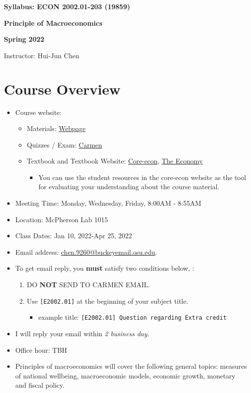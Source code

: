 \documentclass[12pt]{article}
\begin{document}
\centerline{\huge\bf Syllabus: ECON 2002.01-203 (19859)}
\medskip
\centerline{\LARGE \bf Principle of Macroeconomics}
\medskip
\centerline{\LARGE \bf Spring 2022}
\medskip
\centerline{\Large Instructor: Hui-Jun Chen}

\medskip

\section*{Course Overview}
\begin{itemize}

    \item Course website:
    \begin{itemize}
        \item Materials: \href{https://huijunchen9260.github.io/PrincipleMacroSpring2022.html}{Webpage}
        \item Quizzes / Exam: \href{https://osu.instructure.com/courses/114824}{Carmen}
        \item Textbook and Textbook Website: \href{https://www.core-econ.org/}{Core-econ}, \href{https://www.core-econ.org/the-economy/book/text/0-3-contents.html}{The Economy}
        \begin{itemize}
            \item You can use the student resources in the core-econ website as the tool for evaluating your understanding about the course material.
        \end{itemize}
    \end{itemize}
    \item Meeting Time: Monday, Wednesday, Friday, 8:00AM - 8:55AM
    \item Location: McPherson Lab 1015
    \item Class Dates: Jan 10, 2022-Apr 25, 2022
    \item Email address: \href{chen.9260@buckeyemail.osu.edu}{chen.9260@buckeyemail.osu.edu}.
    \item To get email reply, you \textbf{must} satisfy two conditions below, :
    \begin{enumerate}
        \item DO \textbf{NOT} SEND TO CARMEN EMAIL.
        \item Use \texttt{[E2002.01]} at the beginning of your subject title.
        \begin{itemize}
            \item example title: \texttt{[E2002.01] Question regarding Extra credit}
        \end{itemize}
    \end{enumerate}
    \item I will reply your email within \textit{2 business day}.
    \item Office hour: TBH
    \item Principles of macroeconomics will cover the following general topics: measures of national well\-being, macroeconomic models, economic growth, monetary and fiscal policy.
\end{itemize}
\end{document}
